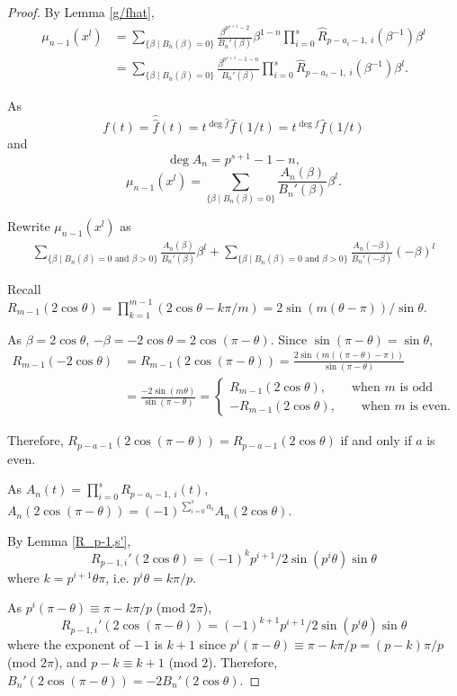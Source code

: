 \documentclass[11 pt]{amsart}
\theoremstyle{plain}
\theoremstyle{definition}
\theoremstyle{remark}
\def\b{\beta}
\def\m{\mu}
\begin{document}
\begin{proof}
    By Lemma \ref{g/fhat}, \begin{align*}
        \m_{n-1}(x^l)&=\sum_{\{\b \mid B_n(\b)=0\}} \frac{\b^{p^{s+1}-2}}{B_n'(\b)}\b^{1-n} \prod_{i=0}^s\widehat{R}_{p-a_i-1,\ i}(\b^{-1})\b^l\\
        &=\sum_{\{\b \mid B_n(\b)=0\}} \frac{\b^{p^{s+1}-1-n}}{B_n'(\b)} \prod_{i=0}^s\widehat{R}_{p-a_i-1,\ i}(\b^{-1})\b^l.        
    \end{align*}

    As $$f(t)=\hat{\hat{f}}(t)=t^{\deg \hat{f}}\hat{f}(1/t)=t^{\deg f}\hat{f}(1/t)$$ and $$\deg A_n=p^{s+1}-1-n,$$ $$\m_{n-1}(x^l)=\sum_{\{\b \mid B_n(\b)=0\}}\frac{A_n(\b)}{B_n'(\b)}\b^l.$$

    Rewrite $\m_{n-1}(x^l)$ as
    \begin{align*}
                \sum_{\{\b \mid B_n(\b)=0 \text{ and } \b>0\}}\frac{A_n(\b)}{B_n'(\b)}\b^l+\sum_{\{\b \mid B_n(\b)=0 \text{ and } \b>0\}}\frac{A_n(-\b)}{B_n'(-\b)}(-\b)^l
    \end{align*}

    Recall $R_{m-1}(2\cos \theta)= \prod_{k=1}^{m-1}(2 \cos \theta - k\pi/m)=2\sin (m (\theta-\pi))/ \sin \theta$.

    As $\b=2 \cos \theta$,  $-\b=-2 \cos \theta=2 \cos (\pi-\theta)$. Since $\sin (\pi-\theta)=\sin \theta$, \begin{align*}
        R_{m-1}(-2\cos \theta)&=R_{m-1}(2 \cos (\pi-\theta))=\frac{2\sin (m ((\pi-\theta)-\pi))}{\sin (\pi-\theta)}\\
        &=\frac{-2 \sin (m\theta)}{ \sin (\pi-\theta)}=\begin{cases}
            R_{m-1}(2 \cos \theta), \qquad \text{when $m$ is odd}\\
            -R_{m-1}(2\cos \theta), \qquad \text{when $m$ is even.}
        \end{cases}
    \end{align*}
    
    
    Therefore, $R_{p-a-1}(2 \cos (\pi - \theta))=R_{p-a-1}(2 \cos \theta)$ if and only if $a$ is even.

    As $A_n(t)=\prod_{i=0}^sR_{p-a_i-1,\ i}(t)$, $A_n(2 \cos (\pi-\theta))= (-1)^{\sum_{i=0}^s a_i } A_n (2 \cos \theta)$.
    

    By Lemma \ref{R_p-1,s'}, $$R_{p-1, i}'(2\cos \theta)= (-1)^k p^{i+1}/2\sin (p^i\theta) \sin \theta$$ where $k=p^{i+1}\theta\pi$, i.e. $p^i \theta=k\pi/p$. 
    
    As $p^i(\pi-\theta) \equiv \pi-k\pi/p$ (mod $2\pi$), $$R_{p-1, i}'(2 \cos (\pi-\theta))=(-1)^{k+1}p^{i+1}/2\sin (p^i\theta) \sin \theta$$ where the exponent of $-1$ is $k+1$ since $p^i(\pi-\theta) \equiv \pi-k\pi/p=(p-k)\pi/p$ (mod $2\pi$), and $p-k\equiv k+1$ (mod $2$). Therefore, $B_n'(2\cos (\pi-\theta))=-2B_n'(2 \cos \theta).$


\end{proof}
\end{document}
